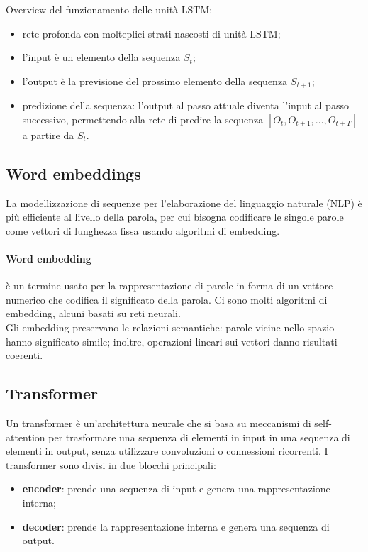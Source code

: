 Overview del funzionamento delle unità LSTM: 
\begin{itemize}
	\item rete profonda con molteplici strati nascosti di unità LSTM;

	\item l'input è un elemento della sequenza $S_t$;

	\item l'output è la previsione del prossimo elemento della sequenza 
		$S_{t+1}$;

	\item predizione della sequenza: l'output al passo attuale diventa l'input 
		al passo successivo, permettendo alla rete di predire la sequenza $[O_t,
		O_{t+1}, \dots, O_{t+T}]$ a partire da $S_t$.
\end{itemize}

\subsection{Word embeddings}
La modellizzazione di sequenze per l'elaborazione del linguaggio naturale (NLP)
è più efficiente al livello della parola, per cui bisogna codificare le singole
parole come vettori di lunghezza fissa usando algoritmi di embedding.

\paragraph{Word embedding} è un termine usato per la rappresentazione di parole
in forma di un vettore numerico che codifica il significato della parola. Ci
sono molti algoritmi di embedding, alcuni basati su reti neurali.\\
Gli embedding preservano le relazioni semantiche: parole vicine nello spazio
hanno significato simile; inoltre, operazioni lineari sui vettori danno
risultati coerenti.

\subsection{Transformer}

Un transformer è un'architettura neurale che si basa su meccanismi di
self-attention per trasformare una sequenza di elementi in input in una sequenza
di elementi in output, senza utilizzare convoluzioni o connessioni ricorrenti.
I transformer sono divisi in due blocchi principali:
\begin{itemize}
	\item \textbf{encoder}: prende una sequenza di input e genera una
		rappresentazione interna;

	\item \textbf{decoder}: prende la rappresentazione interna e genera una
		sequenza di output.
\end{itemize}

